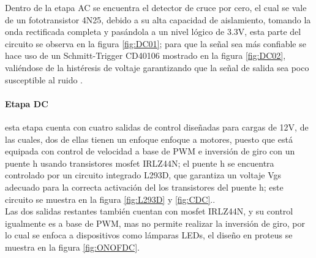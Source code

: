 	
		Dentro de la etapa AC se encuentra el detector de cruce por cero, el cual se vale de un fototransistor 4N25, debido a su alta capacidad de aislamiento, tomando la onda rectificada completa y pasándola a un nivel lógico de 3.3V, esta parte del circuito se observa en la figura \ref{fig:DC01}; para que la señal sea más confiable se hace uso de un Schmitt-Trigger CD40106 mostrado en la figura \ref{fig:DC02}, valiéndose de la histéresis de voltaje garantizando que la señal de salida sea poco susceptible al ruido \cite{DC0}.\\
		
%	
	
	\paragraph{Etapa DC}
		esta etapa cuenta con cuatro salidas de control diseñadas para cargas de 12V, de las cuales, dos de ellas tienen un enfoque enfoque a motores, puesto que está equipada con control de velocidad a base de PWM e inversión de giro con un puente h usando transistores mosfet IRLZ44N; el puente h se encuentra controlado por un circuito integrado L293D, que garantiza un voltaje Vgs adecuado para la correcta activación del los transistores del puente h; este circuito se muestra en la figura \ref{fig:L293D} y \ref{fig:CDC}.\cite{IRL}.\\
		
		Las dos salidas restantes también cuentan con mosfet IRLZ44N, y su control igualmente es a base de PWM, mas no permite realizar la inversión de giro, por lo cual se enfoca a dispositivos como lámparas LEDs, el diseño en proteus se muestra en la figura \ref{fig:ONOFDC}.\\
		
